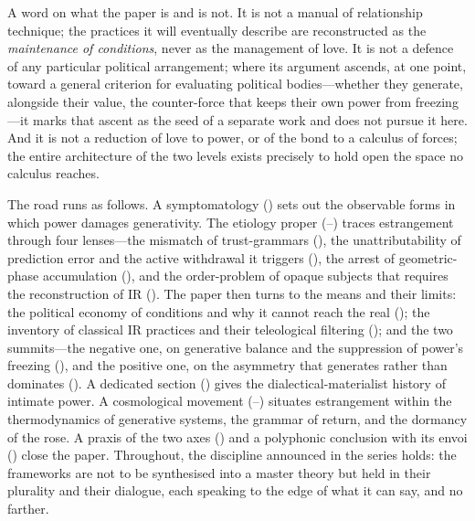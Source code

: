 A word on what the paper is and is not. It is not a manual of relationship technique; the practices it will eventually describe are reconstructed as the \emph{maintenance of conditions}, never as the management of love. It is not a defence of any particular political arrangement; where its argument ascends, at one point, toward a general criterion for evaluating political bodies---whether they generate, alongside their value, the counter-force that keeps their own power from freezing---it marks that ascent as the seed of a separate work and does not pursue it here. And it is not a reduction of love to power, or of the bond to a calculus of forces; the entire architecture of the two levels exists precisely to hold open the space no calculus reaches.

The road runs as follows. A symptomatology () sets out the observable forms in which power damages generativity. The etiology proper (--) traces estrangement through four lenses---the mismatch of trust-grammars (), the unattributability of prediction error and the active withdrawal it triggers (), the arrest of geometric-phase accumulation (), and the order-problem of opaque subjects that requires the reconstruction of IR (). The paper then turns to the means and their limits: the political economy of conditions and why it cannot reach the real (); the inventory of classical IR practices and their teleological filtering (); and the two summits---the negative one, on generative balance and the suppression of power's freezing (), and the positive one, on the asymmetry that generates rather than dominates (). A dedicated section () gives the dialectical-materialist history of intimate power. A cosmological movement (--) situates estrangement within the thermodynamics of generative systems, the grammar of return, and the dormancy of the rose. A praxis of the two axes () and a polyphonic conclusion with its envoi () close the paper. Throughout, the discipline announced in the series holds: the frameworks are not to be synthesised into a master theory but held in their plurality and their dialogue, each speaking to the edge of what it can say, and no farther.
